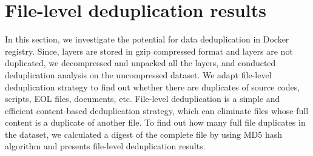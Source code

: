 \section{File-level deduplication results}
\label{sec:redundant_files}



In this section, we
investigate the potential for data deduplication in Docker registry. 
Since, layers are stored in gzip compressed format and layers are not
duplicated, we decompressed and unpacked all the layers, and conducted
deduplication analysis on the uncompressed dataset. 
We adapt file-level deduplication strategy to find out whether
there are duplicates of source codes, scripts, EOL files, documents, etc.
File-level deduplication is a simple and efficient content-based deduplication
strategy, which can eliminate files whose full content is a duplicate of
another file. To find out how many full file duplicates in the dataset, we
calculated a digest of the complete file by using MD5 hash algorithm and
presents file-level deduplication results.



